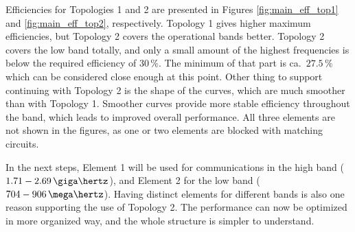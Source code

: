 Efficiencies for Topologies 1 and 2 are presented in Figures \ref{fig:main_eff_top1} and \ref{fig:main_eff_top2}, respectively. Topology 1 gives higher maximum efficiencies, but Topology 2 covers the operational bands better. Topology 2 covers the low band totally, and only a small amount of the highest frequencies is below the required efficiency of $30\,\%$. The minimum of that part is ca.\ $27.5\,\%$ which can be considered close enough at this point. Other thing to support continuing with Topology 2 is the shape of the curves, which are much smoother than with Topology 1. Smoother curves provide more stable efficiency throughout the band, which leads to improved overall performance. All three elements are not shown in the figures, as one or two elements are blocked with matching circuits.

In the next steps, Element 1 will be used for communications in the high band ($1.71-2.69\,\giga\hertz$), and Element 2 for the low band ($704-906\,\mega\hertz$). Having distinct elements for different bands is also one reason supporting the use of Topology 2. The performance can now be optimized in more organized way, and the whole structure is simpler to understand.

